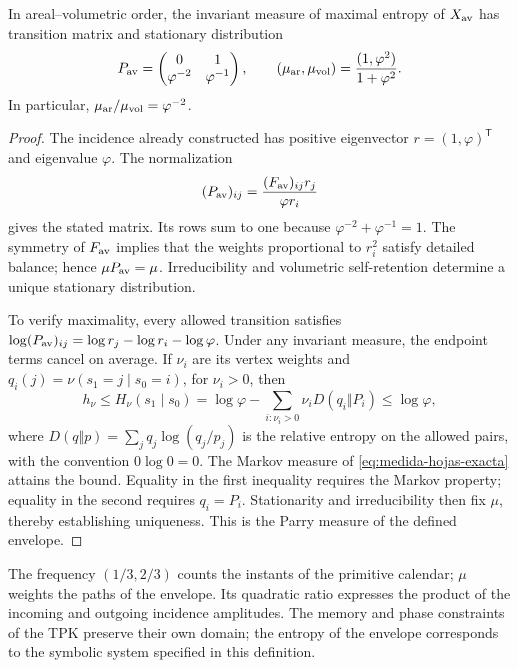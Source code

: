 \begin{proposition}
In areal--volumetric order, the invariant measure of maximal entropy
of \(X_{\rm av}\) has transition matrix and stationary distribution
\begin{equation}
 P_{\rm av}=\begin{pmatrix}0&1\\\varphi^{-2}&\varphi^{-1}\end{pmatrix},
 \qquad
 (\mu_{\rm ar},\mu_{\rm vol})
 =\frac{(1,\varphi^2)}{1+\varphi^2}.
 \label{eq:medida-hojas-exacta}
\end{equation}
In particular, \(\mu_{\rm ar}/\mu_{\rm vol}=\varphi^{-2}\).
\end{proposition}
\begin{proof}
The incidence already constructed has positive eigenvector
\(r=(1,\varphi)^{\mathsf T}\) and eigenvalue \(\varphi\). The
normalization
\[
 (P_{\rm av})_{ij}
 =\frac{(F_{\rm av})_{ij}r_j}{\varphi r_i}
\]
gives the stated matrix. Its rows sum to one because
\(\varphi^{-2}+\varphi^{-1}=1\). The symmetry of \(F_{\rm av}\)
implies that the weights proportional to \(r_i^2\) satisfy detailed
balance; hence \(\mu P_{\rm av}=\mu\). Irreducibility and volumetric
self-retention determine a unique stationary distribution.

To verify maximality, every allowed transition satisfies
\(\log(P_{\rm av})_{ij}=\log r_j-\log r_i-\log\varphi\).
Under any invariant measure, the endpoint terms cancel on average.
If \(\nu_i\) are its vertex weights and
\(q_i(j)=\nu(s_1=j\mid s_0=i)\), for \(\nu_i>0\), then
\[
 h_\nu\leq H_\nu(s_1\mid s_0)
 =\log\varphi-\sum_{i:\nu_i>0}\nu_iD(q_i\Vert P_i)
 \leq\log\varphi,
\]
where \(D(q\Vert p)=\sum_jq_j\log(q_j/p_j)\) is the relative entropy
on the allowed pairs, with the convention \(0\log0=0\).
The Markov measure of \eqref{eq:medida-hojas-exacta} attains the bound.
Equality in the first inequality requires the Markov property;
equality in the second requires \(q_i=P_i\). Stationarity and
irreducibility then fix \(\mu\), thereby establishing uniqueness.
This is the Parry measure of the defined envelope.
\end{proof}

The frequency \((1/3,2/3)\) counts the instants of the primitive calendar;
\(\mu\) weights the paths of the envelope. Its quadratic ratio
expresses the product of the incoming and outgoing incidence amplitudes.
The memory and phase constraints of the TPK preserve their own domain;
the entropy of the envelope corresponds to the symbolic system
specified in this definition.

